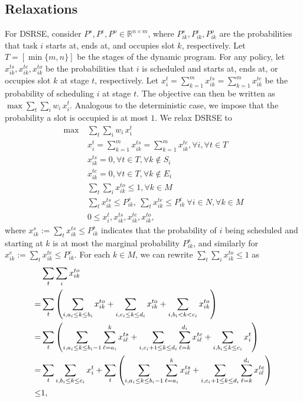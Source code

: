 \documentclass{article}
\newcommand{\R}{\mathbb{R}}
\begin{document}
\subsection{Relaxations}
For DSRSE, consider $P^s,P^e,P^o\in\R^{n\times m}$, where $P_{ik}^s,P_{ik}^e,P_{ik}^o$ are the probabilities that task $i$ starts at, ends at, and occupies slot $k$, respectively.
Let $T=[\min\{m,n\}]$ be the stages of the dynamic program.
For any policy, let $x_{ik}^{ts},x_{ik}^{te},x_{ik}^{to}$ be the probabilities that $i$ is scheduled and starts at, ends at, or occupies slot $k$ at stage $t$, respectively.
Let $x_i^t = \sum_{k=1}^m x_{ik}^{ts}=\sum_{k=1}^{m} x_{ik}^{te}$ be the probability of scheduling $i$ at stage $t$.
The objective can then be written as $ \max \sum_{t}\sum_i w_i\, x_{i}^t $.
Analogous to the deterministic case, we impose that the probability a slot is occupied is at most $1$.
We relax DSRSE to
\begin{align*}
    \max~&\sum_{t}\sum_i w_i\, x_{i}^{t}\\
    &x_i^t =\sum_{k=1}^{m}x_{ik}^{ts}=\sum_{k=1}^{m}x_{ik}^{te}, \forall i,\forall t\in T\\
    &x_{ik}^{ts}=0,\forall t\in T,\forall k\notin S_i\\
    &x_{ik}^{te}=0,\forall t\in T,\forall k\notin E_i\\
    &\sum_t\sum_i x_{ik}^{to}\leq 1,\forall k\in M\\
    &\sum_{t}x_{ik}^{ts}\leq P_{ik}^{s},~\sum_{t}x_{ik}^{te}\leq P_{ik}^{e}~\forall i\in N,\forall k\in M\\
    &0\leq x_{i}^{t}, x_{ik}^{ts},x_{ik}^{te}, x_{ik}^{to},
\end{align*}
where $x_{ik}^s:=\sum_{t}x_{ik}^{ts}\leq P_{ik}^s$ indicates that the probability of $i$ being scheduled and starting at $k$ is at most the marginal probability $P_{ik}^s$, and similarly for $x_{ik}^{e}:=\sum_t x_{ik}^{te}\leq P_{ik}^e$.
For each $k\in M$, we can rewrite $\sum_t\sum_i x_{ik}^{to}\leq 1$ as
\begin{align}
    &\sum_{t}\sum_{i}x_{ik}^{to}\notag \\
=&\sum_{t} \left(\sum_{i,a_i\leq k\leq b_i}x_{ik}^{to}+\sum_{i,c_i\leq k\leq d_i}x_{ik}^{to}+\sum_{i,b_i< k< c_i}x_{ik}^{to}\right) \notag \\
= &\sum_{t} \left(\sum_{i,a_i\leq k\leq b_i-1}\sum_{\ell = a_i}^{k}x_{i\ell}^{ts}+\sum_{i,c_i+1\leq k\leq d_i}\sum_{\ell =k}^{d_i}x_{i\ell}^{te}+\sum_{i,b_i\leq k\leq c_i}x_{i}^{t}\right)  \notag \\
=&\sum_{t}\sum_{i, b_i\leq k\leq c_i} x_i^t+\sum_t \left(\sum_{i,a_i\leq k\leq b_i-1}\sum_{\ell = a_i}^{k}x_{i\ell}^{ts}+\sum_{i,c_i+1\leq k\leq d_i}\sum_{\ell =k}^{d_i}x_{i\ell}^{te}\right)\notag \\
\leq &1,  \label{eq:1}
\end{align}
\end{document}
